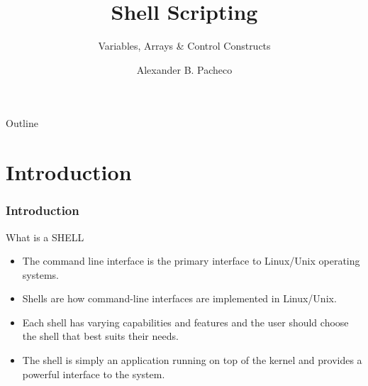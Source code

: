 \documentclass[10pt,t]{beamer}
\title{Shell Scripting}
\subtitle{Variables, Arrays \& Control Constructs}
\author{Alexander B. Pacheco}
\institute{\href{http://researchcomputing.lehigh.edu}{LTS Research Computing}}%
\date{ }
\begin{document}
\begin{frame}
  \titlepage
\end{frame}

\footnotesize
\begin{frame}{Outline}
  \tableofcontents
\end{frame}

\section{Introduction}
\begin{frame}[label=day1]
  \frametitle{Introduction}
  \begin{exampleblock}{What is a SHELL}
    \begin{itemize}
      \item The command line interface is the primary interface to Linux/Unix operating systems.
      \item Shells are how command-line interfaces are implemented in Linux/Unix.
      \item Each shell has varying capabilities and features and the user should choose the shell that best suits their needs.
      \item The shell is simply an application running on top of the kernel and provides a powerful interface to the system.
    \end{itemize}
  \end{exampleblock}
\end{frame}
\end{document}
